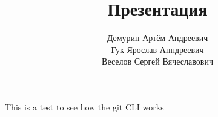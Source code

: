 \documentclass[12pt]{beamer}
\title{Презентация}
\author{Демурин Артём Андреевич \\ Гук Ярослав Анндреевич  \\ Веселов Сергей Вячеславович}
\institute[МИСИС]{Институт Новых Материалов}
\date[?/?/?]
\begin{document}
\frame{\titlepage}

\begin{frame}
    This is a test to see how the git CLI works
\end{frame}
\end{document}

